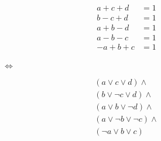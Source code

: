 \begin{figure}[htbp!]
	\centering
	\begin{minipage}{.4\textwidth}
		\begin{align*}
			a + c + d &= 1 \\
			b - c + d &= 1 \\
			a + b - d &= 1 \\
			a - b - c &= 1 \\
			-a + b + c &= 1 \\
		\end{align*}
	\end{minipage}
	$\iff$
	\begin{minipage}{.4\textwidth}
		\begin{align*}
			(a \lor c \lor d) \land \\
			(b \lor \lnot c \lor d) \land \\
			(a \lor b \lor \lnot d) \land \\
			(a \lor \lnot b \lor \lnot c) \land \\
			(\lnot a \lor b \lor c) \\
		\end{align*}    
	\end{minipage}
\end{figure}

